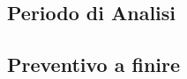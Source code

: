 \documentclass[../piano_di_progetto.tex]{subfiles}
\begin{document}
\subsection{ Periodo di Analisi}%
\label{sub:cons_analisi}

\subsection{ Preventivo a finire}%
\label{sub:cons_fine}
\end{document}
